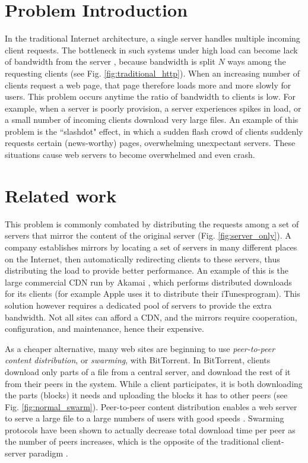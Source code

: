 \section {Problem Introduction}
In the traditional Internet architecture, a single server handles multiple incoming client requests.  
The bottleneck in such systems under high load can become lack of bandwidth from the server \cite{coopnet}, because bandwidth is split $N$ 
ways among the requesting clients (see Fig. \ref{fig:traditional_http}).  When an increasing number of clients request a web page, that page 
therefore loads more and more slowly for users.  This problem occurs anytime the ratio of bandwidth to clients is low.  For example, when a server 
is poorly provision, a server experiences spikes in load, or a small number of incoming clients download very large files.  An example of this problem 
is the ``slashdot" effect, in which a sudden flash crowd of clients suddenly requests certain (news-worthy) pages, overwhelming unexpectant servers.  
These situations cause web servers to become overwhelmed and even crash.

\section {Related work}
This problem is commonly combated by distributing the requests among a set of servers that mirror the content of the original server (Fig. \ref{fig:server_only}).  
A company establishes mirrors by locating a set of servers in many different places on the Internet, then automatically redirecting clients to these servers, thus 
distributing the load to provide better performance.  An example of this is the large commercial CDN run by Akamai \cite{akamai}, which performs distributed
downloads for its clients (for example Apple uses it to distribute their iTunes\texttrademark  program).  This solution however requires a dedicated pool of 
servers to provide the extra bandwidth.  Not all sites can afford a CDN, and the mirrors require cooperation, configuration, and maintenance, hence their expensive.

As a cheaper alternative, many web sites are beginning to use \emph{peer-to-peer content distribution}, or \emph{swarming}, with BitTorrent.  In BitTorrent, clients 
download only parts of a file from a central server, and download the rest of it from their peers in the system.  While a client participates, it is both downloading 
the parts (blocks) it needs and uploading the blocks it has to other peers (see Fig. \ref{fig:normal_swarm}).  Peer-to-peer content distribution enables a 
web server to serve a large file to a large numbers of users with good speeds \cite{zappala}. Swarming protocols have been shown to actually decrease total download 
time per peer as the number of peers increases, which is the opposite of the traditional client-server paradigm \cite{slurpie}. 

